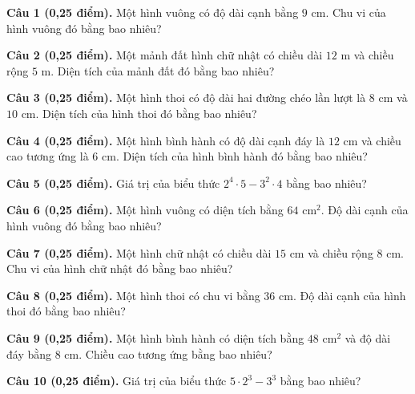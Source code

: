 \documentclass[12pt,a4paper]{article}
\begin{document}
\noindent\textbf{Câu 1 (0,25 điểm).} Một hình vuông có độ dài cạnh bằng $9\text{ cm}$. Chu vi của hình vuông đó bằng bao nhiêu? \par\vspace{0.3mm}
\noindent\textbf{Câu 2 (0,25 điểm).} Một mảnh đất hình chữ nhật có chiều dài $12\text{ m}$ và chiều rộng $5\text{ m}$. Diện tích của mảnh đất đó bằng bao nhiêu? \par\vspace{0.3mm}
\noindent\textbf{Câu 3 (0,25 điểm).} Một hình thoi có độ dài hai đường chéo lần lượt là $8\text{ cm}$ và $10\text{ cm}$. Diện tích của hình thoi đó bằng bao nhiêu? \par\vspace{0.3mm}
\noindent\textbf{Câu 4 (0,25 điểm).} Một hình bình hành có độ dài cạnh đáy là $12\text{ cm}$ và chiều cao tương ứng là $6\text{ cm}$. Diện tích của hình bình hành đó bằng bao nhiêu? \par\vspace{0.3mm}
\noindent\textbf{Câu 5 (0,25 điểm).} Giá trị của biểu thức $2^4 \cdot 5 - 3^2 \cdot 4$ bằng bao nhiêu? \par\vspace{0.3mm}
\noindent\textbf{Câu 6 (0,25 điểm).} Một hình vuông có diện tích bằng $64\text{ cm}^2$. Độ dài cạnh của hình vuông đó bằng bao nhiêu? \par\vspace{0.3mm}
\noindent\textbf{Câu 7 (0,25 điểm).} Một hình chữ nhật có chiều dài $15\text{ cm}$ và chiều rộng $8\text{ cm}$. Chu vi của hình chữ nhật đó bằng bao nhiêu? \par\vspace{0.3mm}
\noindent\textbf{Câu 8 (0,25 điểm).} Một hình thoi có chu vi bằng $36\text{ cm}$. Độ dài cạnh của hình thoi đó bằng bao nhiêu? \par\vspace{0.3mm}
\noindent\textbf{Câu 9 (0,25 điểm).} Một hình bình hành có diện tích bằng $48\text{ cm}^2$ và độ dài đáy bằng $8\text{ cm}$. Chiều cao tương ứng bằng bao nhiêu? \par\vspace{0.3mm}
\noindent\textbf{Câu 10 (0,25 điểm).} Giá trị của biểu thức $5 \cdot 2^3 - 3^3$ bằng bao nhiêu? \par\vspace{0.3mm}
\vspace{0.4mm}
\end{document}
